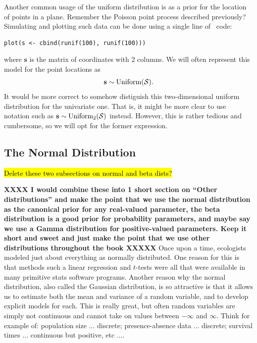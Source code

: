 Another common usage of the uniform distribution is as a prior for the
location of points in a plane. Remember the Poisson point process
described previously? Simulating and plotting such data can be done
using a single line of \R~code:
\begin{verbatim}
plot(s <- cbind(runif(100), runif(100)))
\end{verbatim}
where $\mathbf{s}$ is the matrix of coordinates with 2 columns. We
will often represent this model for the point locations as
\begin{equation}
  {\bf s} \sim \text{Uniform}(\mathcal{S}).
\end{equation}
It would be more correct to somehow distiguish this
two-dimensional uniform distribution for the univariate one. That is,
it might be more clear to use notation such as
${\bf s} \sim \text{Uniform}_2(\mathcal{S})$ instead. However, this is rather
tedious and cumbersome, so we will opt for the former expression.




\subsection{The Normal Distribution}

\hl{Delete these two subsections on normal and beta dists?}

{\bf XXXX I would combine these into 1 short section on ``Other
  distributions'' and make the point that we use the normal
  distribution as the canonical prior for any real-valued parameter,
  the beta distribution is a good prior for probability parameters,
  and maybe say we use a Gamma distribution for positive-valued
  parameters. Keep it short and sweet and just make the point that we
  use other distributions throughout the book
 XXXXX}
Once upon a time, ecologists modeled just about everything as normally
distributed. One reason for this is that methods such a linear
regression and $t$-tests were all that were available in many
primitive stats software programs. Another reason why the normal
distribution, also called the Gaussian distribution, is so attractive
is that it allows us to estimate both the mean and variance of a
random variable, and to develop explicit models for each. This is really
great, but often random variables are simply not continuous and cannot
take on values between $-\infty$ and $\infty$. Think for example of:
population size $\dots$ discrete; presence-absence data $\dots$ discrete;
survival times $\dots$ continuous but positive, etc $\dots$.

